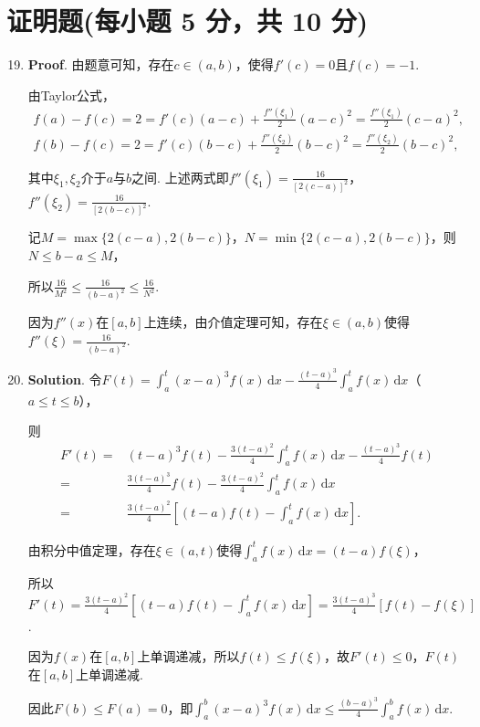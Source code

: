 \documentclass[../Main.tex]{subfiles}
\begin{document}
\section{证明题(每小题 5 分，共 10 分)}
\begin{enumerate}
    \setcounter{enumi}{18}
    \item \textbf{Proof}. 由题意可知，存在$c\in(a,b)$，使得$f'(c)=0$且$f(c)=
              -1$.

          由Taylor公式，
          \[
              \begin{gathered}
                  f(a)-f(c)=2=f'(c)(a-c)+\frac{f''(\xi_{1})}{2}(a-c)^2=\frac{f''(\xi_{1})}{2}(c-a)^2,
                  \\
                  f(b)-f(c)=2=f'(c)(b-c)+\frac{f''(\xi_{2})}{2}(b-c)^2=\frac{f''(\xi_{2})}{2}(b-c)^2,
              \end{gathered}
          \]

          其中$\xi_{1},\xi_{2}$介于$a$与$b$之间. 上述两式即$f''(\xi_{1})=\frac{16}{[2(c-a)]^{2}}$，$f
              ''(\xi_{2})=\frac{16}{[2(b-c)]^{2}}$.

          记$M=\max\{2(c-a),2(b-c)\}$，$N=\min\{2(c-a),2(b-c)\}$，则$N\leq b-a \leq M$，

          所以$\frac{16}{M^{2}}\leq\frac{16}{(b-a)^{2}}\leq\frac{16}{N^{2}}$.

          因为$f''(x)$在$[a,b]$上连续，由介值定理可知，存在$\xi\in(a,b)$使得$f''(\xi)
              =\frac{16}{(b-a)^{2}}$.

    \item \textbf{Solution}. 令$F(t)=\int_{a}^{t}(x-a)^{3} f(x)\,\mathrm{d}x-\frac{(t-a)^{3}}{4}
              \int_{a}^{t}f(x)\,\mathrm{d}x$（$a\leq t \leq b$），

          则
          \[
              \begin{aligned}
                  F'(t) = & (t-a)^{3} f(t) - \frac{3(t-a)^2}{4}\int_{a}^{t}f(x)\,\mathrm{d}x - \frac{(t-a)^3}{4}f(t) \\
                  =       & \frac{3(t-a)^3}{4}f(t) - \frac{3(t-a)^2}{4}\int_{a}^{t}f(x)\,\mathrm{d}x                 \\
                  =       & \frac{3(t-a)^2}{4}\left[(t-a)f(t) - \int_{a}^{t}f(x)\,\mathrm{d}x\right].
              \end{aligned}
          \]

          由积分中值定理，存在$\xi\in(a,t)$使得$\int_{a}^{t}f(x)\,\mathrm{d}x = (t-a)f(
              \xi)$，

          所以$F'(t) = \frac{3(t-a)^{2}}{4}\left[(t-a)f(t) - \int_{a}^{t}f(x)\,\mathrm{d}
                  x\right] = \frac{3(t-a)^{3}}{4}[f(t) - f(\xi)]$.

          因为$f(x)$在$[a,b]$上单调递减，所以$f(t)\leq f(\xi)$，故$F'(t)\leq0$，$F(t)$在$[
                  a,b]$上单调递减.

          因此$F(b) \leq F(a) = 0$，即$\int_{a}^{b}(x-a)^{3} f(x)\,\mathrm{d}x \leq \frac{(b-a)^{3}}{4}
              \int_{a}^{b}f(x)\,\mathrm{d}x$.
\end{enumerate}
\end{document}
